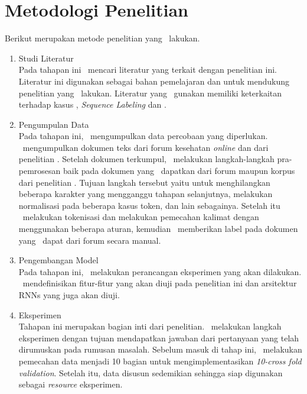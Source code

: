\section{Metodologi Penelitian}
Berikut merupakan metode penelitian yang \saya~lakukan.
\begin{enumerate}
	\item Studi Literatur\\
	Pada tahapan ini \saya~mencari literatur yang terkait dengan penelitian ini. Literatur ini digunakan sebagai bahan pemelajaran dan untuk mendukung penelitian yang \saya~lakukan. Literatur yang \saya~gunakan memiliki keterkaitan terhadap kasus \mer, \textit{Sequence Labeling} dan \rnn.
	
	\item Pengumpulan Data \\
	Pada tahapan ini, \saya~mengumpulkan data percobaan yang diperlukan. \Saya~mengumpulkan dokumen teks dari forum kesehatan \textit{online} dan dari penelitian \cite{skripsiKakRadit}. Setelah dokumen terkumpul, \saya~melakukan langkah-langkah pra-pemrosesan baik pada dokumen yang \saya~dapatkan dari forum maupun korpus dari penelitian \cite{skripsiKakRadit}. Tujuan langkah tersebut yaitu untuk menghilangkan beberapa karakter yang mengganggu tahapan selanjutnya, melakukan normalisasi pada beberapa kasus token, dan lain sebagainya. Setelah itu \saya~melakukan tokenisasi dan melakukan pemecahan kalimat dengan menggunakan beberapa aturan, kemudian \saya~memberikan label pada dokumen yang \saya~dapat dari forum secara manual. 
	
	\item Pengembangan Model\\
	Pada tahapan ini, \saya~melakukan perancangan eksperimen yang akan dilakukan. \Saya~mendefinisikan fitur-fitur yang akan diuji pada penelitian ini dan arsitektur RNNs yang juga akan diuji.
		
	\item Eksperimen \\
	Tahapan ini merupakan bagian inti dari penelitian. \saya~melakukan langkah eksperimen dengan tujuan mendapatkan jawaban dari pertanyaan yang telah dirumuskan pada rumusan masalah. Sebelum masuk di tahap ini, \saya~melakukan pemecahan data menjadi 10 bagian untuk mengimplementasikan \textit{10-cross fold validation}. Setelah itu, data disusun sedemikian sehingga siap digunakan sebagai \textit{resource} eksperimen.
	

\end{enumerate}
